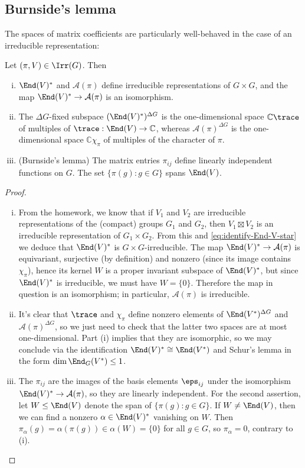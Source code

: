 \documentclass[reqno]{amsart} 
\begin{document}
\subsection{Burnside's lemma}
The spaces of matrix coefficients are particularly well-behaved in the case of an irreducible representation:
\begin{lemma}\label{lem:schur-for-inner-products}
  Let $(\pi,V) \in \Irr(G)$.  Then
  \begin{enumerate}
[(i)]
  \item $\End(V)^*$ and $\mathcal{A}(\pi)$ define irreducible representations of $G \times G$, and the map $\End(V)^* \rightarrow \mathcal{A}(\pi)$ is an isomorphism.
  \item The $\Delta G$-fixed subspace $(\End(V)^*)^{\Delta G}$ is the one-dimensional space $\mathbb{C} \trace$ of multiples of $\trace : \End(V) \rightarrow \mathbb{C}$, whereas $\mathcal{A}(\pi)^{\Delta G}$ is the one-dimensional space $\mathbb{C} \chi_\pi$ of multiples of the character of $\pi$.
  \item (Burnside's lemma) The matrix entries $\pi_{i j}$ define linearly independent functions on $G$.  The set $\{\pi(g) : g \in G\}$ spans $\End(V)$.
  \end{enumerate}
\end{lemma}
\begin{proof}
  \begin{enumerate}
[(i)]
  \item From the homework, we know that if $V_1$ and $V_2$ are irreducible representations of the (compact) groups $G_1$ and $G_2$, then $V_1 \boxtimes V_2$ is an irreducible representation of $G_1 \times G_2$.  From this and \eqref{eq:identify-End-V-star} we deduce that $\End(V)^*$ is $G \times G$-irreducible.  The map $\End(V)^* \rightarrow \mathcal{A}(\pi)$ is equivariant, surjective (by definition) and nonzero (since its image contains $\chi_\pi$), hence its kernel $W$ is a proper invariant subspace of $\End(V)^*$, but since $\End(V)^*$ is irreducible, we must have $W = \{0\}$.  Therefore the map in question is an isomorphism; in particular, $\mathcal{A}(\pi)$ is irreducible.
  \item It's clear that $\trace$ and $\chi_\pi$ define nonzero elements of $\End(V^*)^{\Delta G}$ and $\mathcal{A}(\pi)^{\Delta G}$, so we just need to check that the latter two spaces are at most one-dimensional.  Part (i) implies that they are isomorphic, so we may conclude via the identification $\End(V)^* \cong \End(V^*)$ and Schur's lemma in the form $\dim \End_G(V^*) \leq 1$.
  \item The $\pi_{i j}$ are the images of the basis elements $\eps_{i j}$ under the isomorphism $\End(V)^* \rightarrow \mathcal{A}(\pi)$, so they are linearly independent.  For the second assertion, let $W \leq \End(V)$ denote the span of $\{\pi(g) : g \in G\}$.  If $W \neq \End(V)$, then we can find a nonzero $\alpha \in \End(V)^*$ vanishing on $W$.  Then $\pi_\alpha(g) = \alpha(\pi(g)) \in \alpha(W) = \{0\}$ for all $g \in G$, so $\pi_\alpha = 0$, contrary to (i).
  \end{enumerate}
\end{proof}
\end{document}
